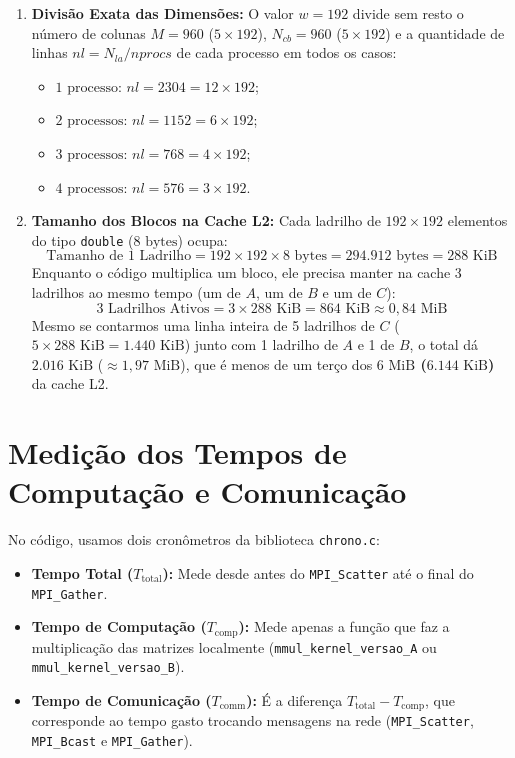 \documentclass[12pt, a4paper, twoside, chapter=TITLE, subsection=TITLE, section=TITLE, subsubsection=TITLE, english, brazil]{abntex2}
\begin{document}
\begin{enumerate}
    \item \textbf{Divisão Exata das Dimensões:} O valor $w = 192$ divide sem resto o número de colunas $M = 960$ ($5 \times 192$), $N_{cb} = 960$ ($5 \times 192$) e a quantidade de linhas $nl = N_{la} / nprocs$ de cada processo em todos os casos:
    \begin{itemize}
        \item $1\text{ processo}$: $nl = 2304 = 12 \times 192$;
        \item $2\text{ processos}$: $nl = 1152 = 6 \times 192$;
        \item $3\text{ processos}$: $nl = 768 = 4 \times 192$;
        \item $4\text{ processos}$: $nl = 576 = 3 \times 192$.
    \end{itemize}

    \item \textbf{Tamanho dos Blocos na Cache L2:} Cada ladrilho de $192 \times 192$ elementos do tipo \texttt{double} ($8\text{ bytes}$) ocupa:
    \begin{equation}
        \text{Tamanho de 1 Ladrilho} = 192 \times 192 \times 8\text{ bytes} = 294.912\text{ bytes} = 288\text{ KiB}
    \end{equation}
    Enquanto o código multiplica um bloco, ele precisa manter na cache 3 ladrilhos ao mesmo tempo (um de $A$, um de $B$ e um de $C$):
    \begin{equation}
        3\text{ Ladrilhos Ativos} = 3 \times 288\text{ KiB} = 864\text{ KiB} \approx 0,84\text{ MiB}
    \end{equation}
    Mesmo se contarmos uma linha inteira de 5 ladrilhos de $C$ ($5 \times 288\text{ KiB} = 1.440\text{ KiB}$) junto com 1 ladrilho de $A$ e 1 de $B$, o total dá $2.016\text{ KiB}$ ($\approx 1,97\text{ MiB}$), que é menos de um terço dos \textbf{$6\text{ MiB}$ ($6.144\text{ KiB}$)} da cache L2.
\end{enumerate}

\section{Medição dos Tempos de Computação e Comunicação}
No código, usamos dois cronômetros da biblioteca \nolinkurl{chrono.c}:
\begin{itemize}
    \item \textbf{Tempo Total ($T_{\text{total}}$):} Mede desde antes do \nolinkurl{MPI_Scatter} até o final do \nolinkurl{MPI_Gather}.
    \item \textbf{Tempo de Computação ($T_{\text{comp}}$):} Mede apenas a função que faz a multiplicação das matrizes localmente (\nolinkurl{mmul_kernel_versao_A} ou \nolinkurl{mmul_kernel_versao_B}).
    \item \textbf{Tempo de Comunicação ($T_{\text{comm}}$):} É a diferença $T_{\text{total}} - T_{\text{comp}}$, que corresponde ao tempo gasto trocando mensagens na rede (\nolinkurl{MPI_Scatter}, \nolinkurl{MPI_Bcast} e \nolinkurl{MPI_Gather}).
\end{itemize}
\end{document}
